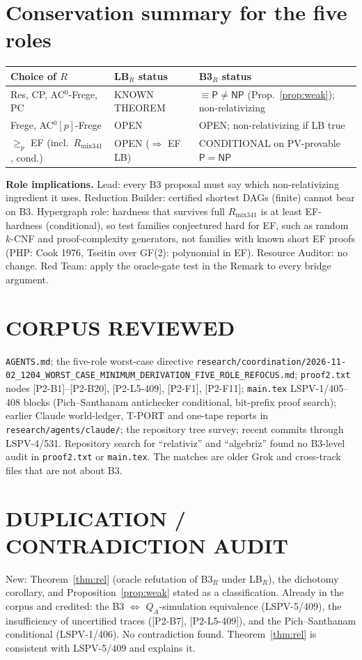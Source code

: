 \documentclass[11pt]{article}
\theoremstyle{definition}
\theoremstyle{remark}
\newcommand{\NP}{\mathsf{NP}}
\newcommand{\Pc}{\mathsf{P}}
\begin{document}
\section{Conservation summary for the five roles}
\begin{center}
\begin{tabular}{lll}
Choice of $R$ & LB$_R$ status & B3$_R$ status\\\hline
Res, CP, AC$^0$-Frege, PC & KNOWN THEOREM & $\equiv\Pc\neq\NP$ (Prop.~\ref{prop:weak}); non-relativizing\\
Frege, AC$^0[p]$-Frege & OPEN & OPEN; non-relativizing if LB true\\
$\ge_p$ EF (incl.\ $R_{\mathrm{mix341}}$, cond.) & OPEN ($\Rightarrow$ EF LB) & CONDITIONAL on PV-provable $\Pc=\NP$\\
\end{tabular}
\end{center}
\textbf{Role implications.} Lead: every B3 proposal must say which non-relativizing
ingredient it uses. Reduction Builder: certified shortest DAGs (finite) cannot bear on B3.
Hypergraph role: hardness that survives full $R_{\mathrm{mix341}}$ is at least EF-hardness
(conditional), so test families conjectured hard for EF, such as random $k$-CNF and
proof-complexity generators, not families with known short EF proofs (PHP: Cook 1976,
Tseitin over GF(2): polynomial in EF). Resource Auditor: no change. Red Team: apply the
oracle-gate test in the Remark to every bridge argument.

\section*{CORPUS REVIEWED}
\texttt{AGENTS.md}; the five-role worst-case directive
\texttt{research/coordination/2026-11-02\_1204\_WORST\_CASE\_MINIMUM\_DERIVATION\_FIVE\_ROLE\_REFOCUS.md};
\texttt{proof2.txt} nodes [P2-B1]--[P2-B20], [P2-L5-409], [P2-F1], [P2-F11];
\texttt{main.tex} LSPV-1/405--408 blocks (Pich--Santhanam antichecker conditional, bit-prefix
proof search); earlier Claude world-ledger, T-PORT and one-tape reports in
\texttt{research/agents/claude/}; the repository tree survey; recent commits through LSPV-4/531.
Repository search for ``relativiz'' and ``algebriz'' found no B3-level audit in
\texttt{proof2.txt} or \texttt{main.tex}. The matches are older Grok and cross-track files that
are not about B3.

\section*{DUPLICATION / CONTRADICTION AUDIT}
New: Theorem~\ref{thm:rel} (oracle refutation of B3$_R$ under LB$_R$), the dichotomy
corollary, and Proposition~\ref{prop:weak} stated as a classification. Already in the corpus
and credited: the B3 $\iff$ $Q_A$-simulation equivalence (LSPV-5/409), the insufficiency of
uncertified traces ([P2-B7], [P2-L5-409]), and the Pich--Santhanam conditional (LSPV-1/406).
No contradiction found. Theorem~\ref{thm:rel} is consistent with LSPV-5/409 and explains it.
\end{document}
